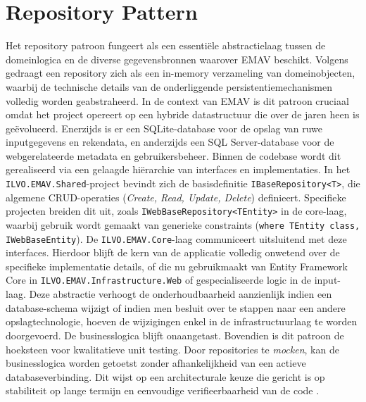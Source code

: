\section{Repository Pattern}
Het repository patroon fungeert als een essentiële abstractielaag tussen de domeinlogica en de diverse gegevensbronnen waarover EMAV beschikt. 
Volgens \textcite{fowlerRepository} gedraagt een repository zich als een in-memory verzameling van domeinobjecten, waarbij de technische details van de onderliggende persistentiemechanismen volledig worden geabstraheerd. 
In de context van EMAV is dit patroon cruciaal omdat het project opereert op een hybride datastructuur die over de jaren heen is geëvolueerd. 
Enerzijds is er een SQLite-database voor de opslag van ruwe inputgegevens en rekendata, en anderzijds een SQL Server-database voor de webgerelateerde metadata en gebruikersbeheer.
Binnen de codebase wordt dit gerealiseerd via een gelaagde hiërarchie van interfaces en implementaties. 
In het \texttt{ILVO.EMAV.Shared}-project bevindt zich de basisdefinitie \texttt{IBaseRepository<T>}, die algemene CRUD-operaties (\textit{Create, Read, Update, Delete}) definieert. 
Specifieke projecten breiden dit uit, zoals \texttt{IWebBaseRepository<TEntity>} in de core-laag, waarbij gebruik wordt gemaakt van generieke constraints (\texttt{where TEntity \: class, IWebBaseEntity}). 
De \texttt{ILVO.EMAV.Core}-laag communiceert uitsluitend met deze interfaces. 
Hierdoor blijft de kern van de applicatie volledig onwetend over de specifieke implementatie details, of die nu gebruikmaakt van Entity Framework Core in \texttt{ILVO.EMAV.Infrastructure.Web} of gespecialiseerde logic in de input-laag.
Deze abstractie verhoogt de onderhoudbaarheid aanzienlijk\: indien een database-schema wijzigt of indien men besluit over te stappen naar een andere opslagtechnologie, hoeven de wijzigingen enkel in de infrastructuurlaag te worden doorgevoerd. 
De businesslogica blijft onaangetast. 
Bovendien is dit patroon de hoeksteen voor kwalitatieve unit testing. 
Door repositories te \textit{mocken}, kan de businesslogica worden getoetst zonder afhankelijkheid van een actieve databaseverbinding. 
Dit wijst op een architecturale keuze die gericht is op stabiliteit op lange termijn en eenvoudige verifieerbaarheid van de code \autocite{millett2015patterns}.
